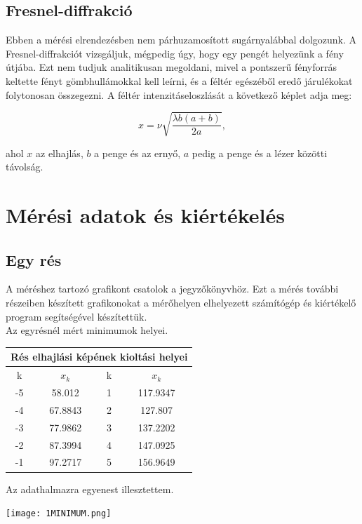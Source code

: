 \documentclass[a4paper,11pt]{article}
\begin{document}
\subsection{Fresnel-diffrakció}

Ebben a mérési elrendezésben nem párhuzamosított sugárnyalábbal dolgozunk. A Fresnel-diffrakciót vizsgáljuk, mégpedig úgy, hogy egy pengét helyezünk a fény útjába. Ezt nem tudjuk analitikusan megoldani, mivel a pontszerű fényforrás keltette fényt gömbhullámokkal kell leírni, és a féltér egészéből eredő járulékokat folytonosan összegezni. A féltér intenzitáseloszlását a következő képlet adja meg:

\begin{equation}
x=\nu \sqrt{\frac{\lambda b (a+b)}{2a}} ,
\end{equation}

ahol $x$ az elhajlás, $b$ a penge és az ernyő, $a$ pedig a penge és a lézer közötti távolság. 

\section{Mérési adatok és kiértékelés}

\subsection{Egy rés}

A méréshez tartozó grafikont csatolok a jegyzőkönyvhöz. Ezt a mérés további részeiben készített grafikonokat a mérőhelyen elhelyezett számítógép és kiértékelő program segítségével készítettük. \\
Az egyrésnél mért minimumok helyei.
\begin{center}
\begin{tabular}{|c|c|c|c|} \hline
\multicolumn{4}{|c|}{Rés elhajlási képének kioltási helyei} \\ \hline
k & $x_k$ & k & $x_k$ \\ \hline
-5 & 58.012 & 1 & 117.9347 \\ \hline
-4 & 67.8843 & 2 & 127.807 \\ \hline
-3 & 77.9862 & 3 & 137.2202 \\ \hline
-2 & 87.3994 & 4 & 147.0925 \\ \hline
-1 & 97.2717 & 5 & 156.9649 \\ \hline
\end{tabular}
\end{center}
Az adathalmazra egyenest illesztettem.
\begin{center}
\texttt{[image: 1MINIMUM.png]}
\end{center}
\end{document}
